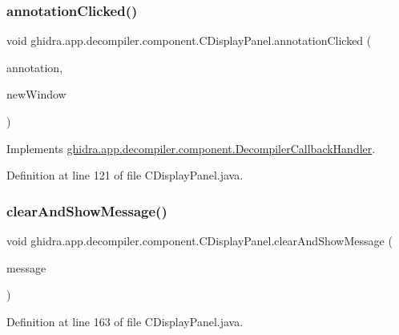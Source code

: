 \subsubsection{\texorpdfstring{annotationClicked()}{annotationClicked()}}
{\footnotesize\ttfamily void ghidra.\+app.\+decompiler.\+component.\+C\+Display\+Panel.\+annotation\+Clicked (\begin{DoxyParamCaption}\item[{Annotated\+Text\+Field\+Element}]{annotation,  }\item[{boolean}]{new\+Window }\end{DoxyParamCaption})\hspace{0.3cm}{\ttfamily [inline]}}



Implements \mbox{\hyperlink{interfaceghidra_1_1app_1_1decompiler_1_1component_1_1_decompiler_callback_handler_a9b7c60460fed31e218b66a0493b43826}{ghidra.\+app.\+decompiler.\+component.\+Decompiler\+Callback\+Handler}}.



Definition at line 121 of file C\+Display\+Panel.\+java.

\mbox{\label{classghidra_1_1app_1_1decompiler_1_1component_1_1_c_display_panel_a4e97fabe9ddab409c2008538a433c297}} 
\subsubsection{\texorpdfstring{clearAndShowMessage()}{clearAndShowMessage()}}
{\footnotesize\ttfamily void ghidra.\+app.\+decompiler.\+component.\+C\+Display\+Panel.\+clear\+And\+Show\+Message (\begin{DoxyParamCaption}\item[{String}]{message }\end{DoxyParamCaption})\hspace{0.3cm}{\ttfamily [inline]}}



Definition at line 163 of file C\+Display\+Panel.\+java.

